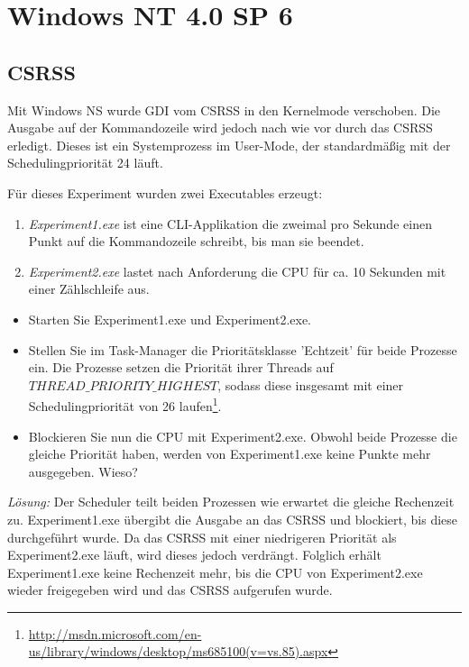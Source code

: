 \section{Windows NT 4.0 SP 6}

	\subsection{CSRSS}

	Mit Windows NS wurde GDI vom CSRSS in den Kernelmode verschoben.
	Die Ausgabe auf der Kommandozeile wird jedoch nach wie vor durch das CSRSS erledigt. 
	Dieses ist ein Systemprozess im User-Mode, der standardmäßig mit der Schedulingpriorität 24 läuft.

	Für dieses Experiment wurden zwei Executables erzeugt:
		\begin{enumerate}
			\item \emph{Experiment1.exe} ist eine CLI-Applikation die zweimal pro Sekunde einen Punkt auf die Kommandozeile schreibt, bis man sie beendet.
			\item \emph{Experiment2.exe} lastet nach Anforderung die CPU für ca. 10 Sekunden mit einer Zählschleife aus.
		\end{enumerate}

	\begin{itemize}
		\item Starten Sie Experiment1.exe und Experiment2.exe. 
		\item Stellen Sie im Task-Manager die Prioritätsklasse 'Echtzeit' für beide Prozesse ein. Die Prozesse setzen die Priorität ihrer Threads auf \texttt{$THREAD\_PRIORITY\_HIGHEST$}, sodass diese insgesamt mit einer Schedulingpriorität von 26 laufen\footnote{\url{http://msdn.microsoft.com/en-us/library/windows/desktop/ms685100(v=vs.85).aspx}}.
		\item Blockieren Sie nun die CPU mit Experiment2.exe. Obwohl beide Prozesse die gleiche Priorität haben, werden von Experiment1.exe keine Punkte mehr ausgegeben. Wieso?
	\end{itemize}


	\emph{Lösung:} Der Scheduler teilt beiden Prozessen wie erwartet die gleiche Rechenzeit zu.
	Experiment1.exe übergibt die Ausgabe an das CSRSS und blockiert, bis diese durchgeführt wurde.
	Da das CSRSS mit einer niedrigeren Priorität als Experiment2.exe läuft, wird dieses jedoch verdrängt.
	Folglich erhält Experiment1.exe keine Rechenzeit mehr, bis die CPU von Experiment2.exe wieder freigegeben wird und das CSRSS aufgerufen wurde.

